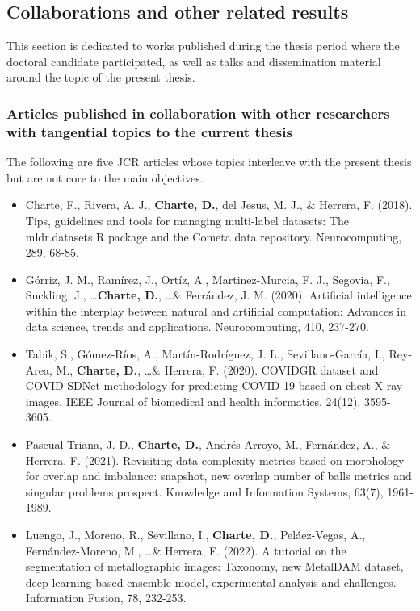 \subsection{Collaborations and other related results}

This section is dedicated to works published during the thesis period where the doctoral candidate participated, as well as talks and dissemination material around the topic of the present thesis.

\subsubsection{Articles published in collaboration with other researchers with tangential topics to the current thesis}

The following are five JCR articles whose topics interleave with the present thesis but are not core to the main objectives. 

\begin{itemize}
    \item Charte, F., Rivera, A. J., \textbf{Charte, D.}, del Jesus, M. J., \& Herrera, F. (2018). Tips, guidelines and tools for managing multi-label datasets: The mldr.datasets R package and the Cometa data repository. Neurocomputing, 289, 68-85.
    \item Górriz, J. M., Ramírez, J., Ortíz, A., Martinez-Murcia, F. J., Segovia, F., Suckling, J., \dots \textbf{Charte, D.}, \dots \& Ferrández, J. M. (2020). Artificial intelligence within the interplay between natural and artificial computation: Advances in data science, trends and applications. Neurocomputing, 410, 237-270.
    \item Tabik, S., Gómez-Ríos, A., Martín-Rodríguez, J. L., Sevillano-García, I., Rey-Area, M., \textbf{Charte, D.}, \dots \& Herrera, F. (2020). COVIDGR dataset and COVID-SDNet methodology for predicting COVID-19 based on chest X-ray images. IEEE Journal of biomedical and health informatics, 24(12), 3595-3605.
    \item Pascual-Triana, J. D., \textbf{Charte, D.}, Andrés Arroyo, M., Fernández, A., \& Herrera, F. (2021). Revisiting data complexity metrics based on morphology for overlap and imbalance: snapshot, new overlap number of balls metrics and singular problems prospect. Knowledge and Information Systems, 63(7), 1961-1989.
    \item Luengo, J., Moreno, R., Sevillano, I., \textbf{Charte, D.}, Peláez-Vegas, A., Fernández-Moreno, M., \dots \& Herrera, F. (2022). A tutorial on the segmentation of metallographic images: Taxonomy, new MetalDAM dataset, deep learning-based ensemble model, experimental analysis and challenges. Information Fusion, 78, 232-253.
\end{itemize}

